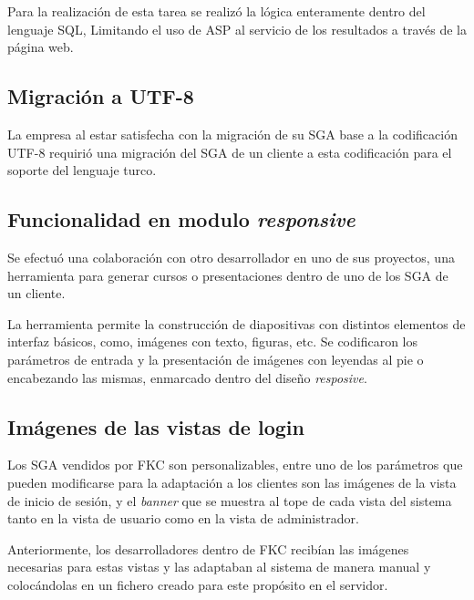 	Para la realización de esta tarea se realizó la lógica enteramente dentro del lenguaje \gls{SQL}, Limitando el uso de \gls{ASP} al servicio de los resultados a través de la página web.


	\subsection{Migración a UTF-8} %
	\label{sub:migracion_a_utf_8}
	
	La empresa al estar satisfecha con la migración de su \gls{SGA} base a la codificación \gls{UTF-8} requirió una migración del \gls{SGA} de un cliente a esta codificación para el soporte del lenguaje turco.

	\subsection{Funcionalidad en modulo \emph{responsive}} %
	\label{sub:funcionalidad_en_modulo_responsive}
	
	Se efectuó una colaboración con otro desarrollador en uno de sus proyectos, una herramienta para generar cursos o presentaciones dentro de uno de los \gls{SGA} de un cliente.

	La herramienta permite la construcción de diapositivas con distintos elementos de interfaz básicos, como, imágenes con texto, figuras, etc. Se codificaron los parámetros de entrada y la presentación de imágenes con leyendas al pie o encabezando las mismas, enmarcado dentro del diseño \emph{resposive}.


	\subsection{Imágenes de las vistas de login} %
	\label{sub:imagenes_de_las_vistas_de_login}
	
	Los \gls{SGA} vendidos por \gls{FKC} son personalizables, entre uno de los parámetros que pueden modificarse para la adaptación a los clientes son las imágenes de la vista de inicio de sesión, y el \emph{banner} que se muestra al tope de cada vista del sistema tanto en la vista de usuario como en la vista de administrador.

	Anteriormente, los desarrolladores dentro de \gls{FKC} recibían las imágenes necesarias para estas vistas y las adaptaban al sistema de manera manual y colocándolas en un fichero creado para este propósito en el servidor.

